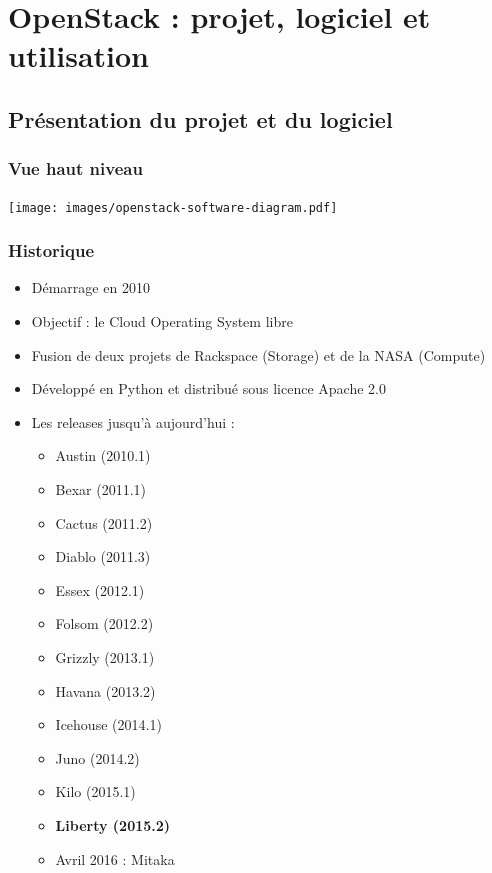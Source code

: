   \section[OpenStack]{OpenStack : projet, logiciel et utilisation}

  \subsection[OpenStack]{Présentation du projet et du logiciel}

  \begin{frame}
    \frametitle{Vue haut niveau}
    \texttt{[image: images/openstack-software-diagram.pdf]}
  \end{frame}

  \begin{frame}
    \frametitle{Historique}
    \begin{itemize}
      \item Démarrage en 2010
      \item Objectif : le Cloud Operating System libre
      \item Fusion de deux projets de Rackspace (Storage) et de la NASA (Compute)
      \item Développé en Python et distribué sous licence Apache 2.0\pause
      \item Les releases jusqu'à aujourd'hui :
      \begin{itemize}
        \item Austin (2010.1)
        \item Bexar (2011.1)
        \item Cactus (2011.2)
        \item Diablo (2011.3)
        \item Essex (2012.1)
        \item Folsom (2012.2)
        \item Grizzly (2013.1)
        \item Havana (2013.2)
        \item Icehouse (2014.1)
        \item Juno (2014.2)
        \item Kilo (2015.1)
        \item \textbf{Liberty (2015.2)}\pause
        \item Avril 2016 : Mitaka
      \end{itemize}
    \end{itemize}
  \end{frame}

